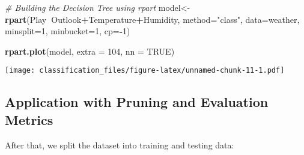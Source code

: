 \documentclass[]{article}
\newenvironment{Shaded}{\begin{snugshade}}{\end{snugshade}}
\newcommand{\CommentTok}[1]{\textcolor[rgb]{0.56,0.35,0.01}{\textit{#1}}}
\newcommand{\DataTypeTok}[1]{\textcolor[rgb]{0.13,0.29,0.53}{#1}}
\newcommand{\DecValTok}[1]{\textcolor[rgb]{0.00,0.00,0.81}{#1}}
\newcommand{\KeywordTok}[1]{\textcolor[rgb]{0.13,0.29,0.53}{\textbf{#1}}}
\newcommand{\NormalTok}[1]{#1}
\newcommand{\OperatorTok}[1]{\textcolor[rgb]{0.81,0.36,0.00}{\textbf{#1}}}
\newcommand{\OtherTok}[1]{\textcolor[rgb]{0.56,0.35,0.01}{#1}}
\newcommand{\StringTok}[1]{\textcolor[rgb]{0.31,0.60,0.02}{#1}}
\begin{document}
\begin{Shaded}
\begin{Highlighting}[]
\CommentTok{# Building the Decision Tree using rpart}
\NormalTok{model<-}\KeywordTok{rpart}\NormalTok{(Play}\OperatorTok{~}\NormalTok{Outlook}\OperatorTok{+}\NormalTok{Temperature}\OperatorTok{+}\NormalTok{Humidity,}
             \DataTypeTok{method=}\StringTok{"class"}\NormalTok{,}
             \DataTypeTok{data=}\NormalTok{weather,}
             \DataTypeTok{minsplit=}\DecValTok{1}\NormalTok{,}
             \DataTypeTok{minbucket=}\DecValTok{1}\NormalTok{,}
             \DataTypeTok{cp=}\OperatorTok{-}\DecValTok{1}\NormalTok{)}
\end{Highlighting}
\end{Shaded}

\begin{Shaded}
\begin{Highlighting}[]
\KeywordTok{rpart.plot}\NormalTok{(model, }\DataTypeTok{extra =} \DecValTok{104}\NormalTok{, }\DataTypeTok{nn =} \OtherTok{TRUE}\NormalTok{)}
\end{Highlighting}
\end{Shaded}

\texttt{[image: classification\_files/figure-latex/unnamed-chunk-11-1.pdf]}

\hypertarget{application-with-pruning-and-evaluation-metrics}{%
\subsection{Application with Pruning and Evaluation
Metrics}\label{application-with-pruning-and-evaluation-metrics}}

\begin{Shaded}
\end{Shaded}

After that, we split the dataset into training and testing data:
\end{document}
